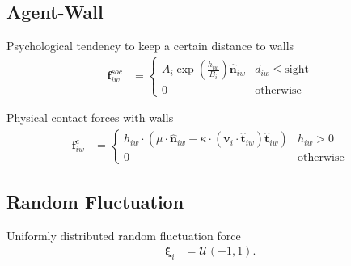 \subsection{Agent-Wall}
Psychological tendency to keep a certain distance to walls
\begin{align}
\mathbf{f}_{iw}^{soc} &=
\begin{cases}
A_{i} \exp\left(\frac{h_{iw}}{B_{i}}\right) \hat{\mathbf{n}}_{iw} &  d_{iw} \leq \text{sight} \\
0 & \text{otherwise}
\end{cases}
\end{align} 

Physical contact forces with walls
\begin{align}
\mathbf{f}_{iw}^{c} &= 
\begin{cases}
h_{iw} \cdot \left(\mu \cdot \hat{\mathbf{n}}_{iw} - \kappa \cdot (\mathbf{v}_{i} \cdot \hat{\mathbf{t}}_{iw}) \hat{\mathbf{t}}_{iw}\right) & h_{iw} > 0 \\
0 & \text{otherwise}
\end{cases}
\end{align}


\subsection{Random Fluctuation}
Uniformly distributed random fluctuation force
\begin{align}
\boldsymbol{\xi}_{i} &= \boldsymbol{\mathcal{U}}(-1, 1).
\end{align}




